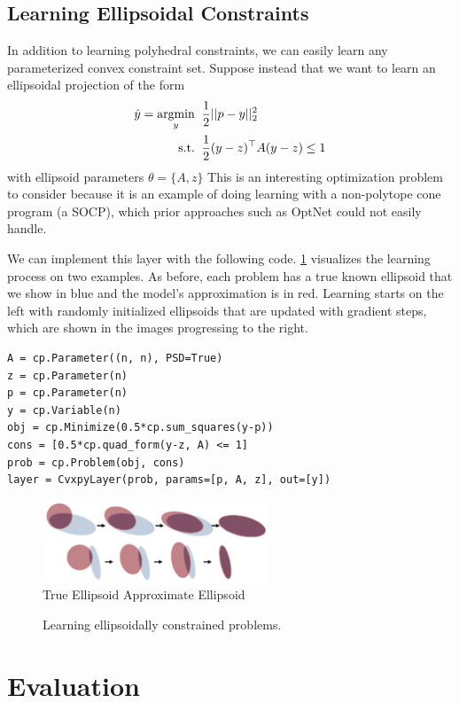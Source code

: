 \newpage
\subsection{Learning Ellipsoidal Constraints}
In addition to learning polyhedral constraints, we can easily
learn any parameterized convex constraint set.
Suppose instead that we want to learn an ellipsoidal
projection of the form
\begin{align*}
\hat y = \operatorname*{argmin}_y\;\; &\frac{1}{2}||p-y||_2^2  \\
 {\rm s.t.}\;\; & \frac{1}{2}(y-z)^\top A(y-z) \leq 1
\end{align*}
with ellipsoid parameters $\theta=\{A,z\}$
This is an interesting optimization problem to consider because
it is an example of doing learning with a non-polytope
cone program (a SOCP), which prior approaches such as OptNet
could not easily handle.

We can implement this layer with the following code.
\cref{fig:ellipsoid-results} visualizes the learning process
on two examples.
As before, each problem has a true known ellipsoid that we show in blue
and the model's approximation is in red.
Learning starts on the left with randomly initialized
ellipsoids that are updated with gradient steps,
which are shown in the images progressing to the right.

\begin{lstlisting}
A = cp.Parameter((n, n), PSD=True)
z = cp.Parameter(n)
p = cp.Parameter(n)
y = cp.Variable(n)
obj = cp.Minimize(0.5*cp.sum_squares(y-p))
cons = [0.5*cp.quad_form(y-z, A) <= 1]
prob = cp.Problem(obj, cons)
layer = CvxpyLayer(prob, params=[p, A, z], out=[y])
\end{lstlisting}

\begin{figure}[t]
  \centering
  \includegraphics[width=0.6\textwidth]{ellipsoid-frames.png} \\
   True Ellipsoid \enskip
   Approximate Ellipsoid
  \caption{
    Learning ellipsoidally constrained problems.
  }
  \label{fig:ellipsoid-results}
\end{figure}

\newpage
\section{Evaluation}
\label{sec:eval}


